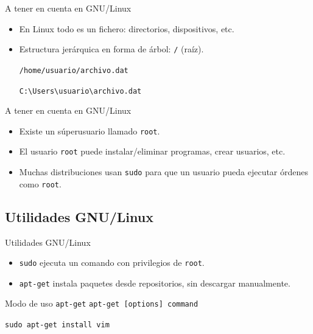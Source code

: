 \documentclass[10pt]{beamer}
\begin{document}
\begin{frame}[fragile]{A tener en cuenta en GNU/Linux}
\begin{itemize}
	\item En Linux todo es un fichero: directorios, dispositivos, etc.
	\item Estructura jerárquica en forma de árbol: \texttt{/} (raíz).
	\begin{example}[Linux]
	\texttt{/home/usuario/archivo.dat}
	\end{example}
	\begin{example}[Windows]
	\texttt{C:\textbackslash Users\textbackslash usuario\textbackslash archivo.dat}
	\end{example}
\end{itemize}
\end{frame}

\begin{frame}{A tener en cuenta en GNU/Linux}
\begin{itemize}
	\item Existe un súperusuario llamado \texttt{root}.
	\item El usuario \texttt{root} puede instalar/eliminar programas, crear usuarios, etc.
	\item Muchas distribuciones usan \texttt{sudo} para que un usuario pueda ejecutar órdenes como \texttt{root}.
\end{itemize}
\end{frame}

\subsection{Utilidades GNU/Linux}

\begin{frame}[fragile]{Utilidades GNU/Linux}
\begin{itemize}
	\item \texttt{sudo} ejecuta un comando con privilegios de \texttt{root}.
	\item \texttt{apt-get} instala paquetes desde repositorios, sin descargar manualmente.
\end{itemize}
\begin{alertblock}{Modo de uso \texttt{apt-get}}
\texttt{apt-get [options] command}
\end{alertblock}
\begin{example}
\texttt{sudo apt-get install vim}
\end{example}
\end{frame}
\end{document}
